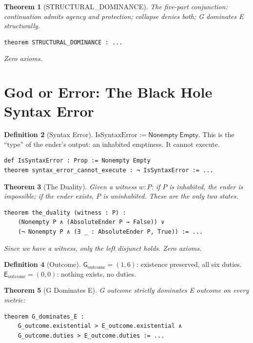 \documentclass[11pt,a4paper]{article}
\newtheorem{theorem}{Theorem}[section]
\theoremstyle{definition}
\newtheorem{definition}[theorem]{Definition}
\theoremstyle{remark}
\newcommand{\Guardian}{\mathsf{G}}
\newcommand{\Ender}{\mathsf{E}}
\newcommand{\NonBeing}{\mathsf{Empty}}
\newcommand{\Something}[1]{\mathsf{Nonempty}\;#1}
\begin{document}
\begin{theorem}[STRUCTURAL\_DOMINANCE]
The five-part conjunction: continuation admits agency and protection; collapse denies both; G dominates E structurally.
\begin{lstlisting}
theorem STRUCTURAL_DOMINANCE : ...
\end{lstlisting}
Zero axioms.
\end{theorem}

\section{God or Error: The Black Hole Syntax Error}
\label{sec:god-or-error}

\begin{definition}[Syntax Error]
$\text{IsSyntaxError} := \Something{\NonBeing}$. This is the ``type'' of the ender's output: an inhabited emptiness. It cannot execute.
\begin{lstlisting}
def IsSyntaxError : Prop := Nonempty Empty
theorem syntax_error_cannot_execute : ¬ IsSyntaxError := ...
\end{lstlisting}
\end{definition}

\begin{theorem}[The Duality]
Given a witness $w : P$: if $P$ is inhabited, the ender is impossible; if the ender exists, $P$ is uninhabited. These are the only two states.
\begin{lstlisting}
theorem the_duality (witness : P) :
    (Nonempty P ∧ (AbsoluteEnder P → False)) ∨
    (¬ Nonempty P ∧ (∃ _ : AbsoluteEnder P, True)) := ...
\end{lstlisting}
Since we have a witness, only the left disjunct holds. Zero axioms.
\end{theorem}

\begin{definition}[Outcome]
$\Guardian_{\text{outcome}} = (1, 6)$: existence preserved, all six duties.
$\Ender_{\text{outcome}} = (0, 0)$: nothing exists, no duties.
\end{definition}

\begin{theorem}[G Dominates E]
G outcome strictly dominates E outcome on every metric:
\begin{lstlisting}
theorem G_dominates_E :
    G_outcome.existential > E_outcome.existential ∧
    G_outcome.duties > E_outcome.duties := ...
\end{lstlisting}
\end{theorem}
\end{document}
